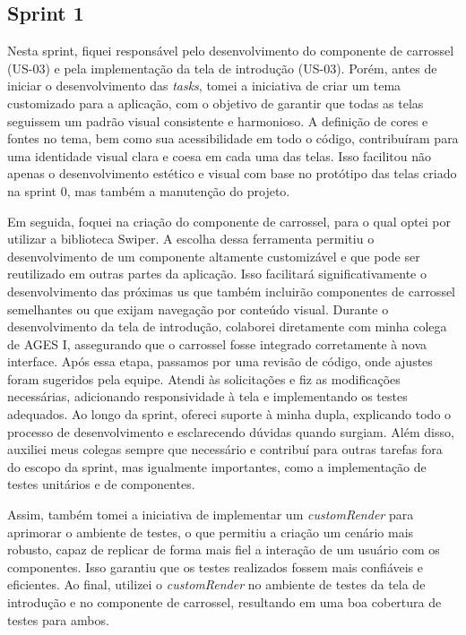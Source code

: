 \subsection{Sprint 1}

Nesta sprint, fiquei responsável pelo desenvolvimento do componente de carrossel (US-03) e pela implementação da tela de introdução (US-03). Porém, antes de iniciar o desenvolvimento das \textit{tasks}, tomei a iniciativa de criar um tema customizado para a aplicação, com o objetivo de garantir que todas as telas seguissem um padrão visual consistente e harmonioso. A definição de cores e fontes no tema, bem como sua acessibilidade em todo o código, contribuíram para uma identidade visual clara e coesa em cada uma das telas. Isso facilitou não apenas o desenvolvimento estético e visual com base no protótipo das telas criado na sprint 0, mas também a manutenção do projeto.

Em seguida, foquei na criação do componente de carrossel, para o qual optei por utilizar a biblioteca Swiper. A escolha dessa ferramenta permitiu o desenvolvimento de um componente altamente customizável e que pode ser reutilizado em outras partes da aplicação. Isso facilitará significativamente o desenvolvimento das próximas \ac{us} que também incluirão componentes de carrossel semelhantes ou que exijam navegação por conteúdo visual. Durante o desenvolvimento da tela de introdução, colaborei diretamente com minha colega de AGES I, assegurando que o carrossel fosse integrado corretamente à nova interface. Após essa etapa, passamos por uma revisão de código, onde ajustes foram sugeridos pela equipe. Atendi às solicitações e fiz as modificações necessárias, adicionando responsividade à tela e implementando os testes adequados. Ao longo da sprint, ofereci suporte à minha dupla, explicando todo o processo de desenvolvimento e esclarecendo dúvidas quando surgiam. Além disso, auxiliei meus colegas sempre que necessário e contribuí para outras tarefas fora do escopo da sprint, mas igualmente importantes, como a implementação de testes unitários e de componentes.

 Assim, também tomei a iniciativa de implementar um \textit{customRender} para aprimorar o ambiente de testes, o que permitiu a criação um cenário mais robusto, capaz de replicar de forma mais fiel a interação de um usuário com os componentes. Isso garantiu que os testes realizados fossem mais confiáveis e eficientes. Ao final, utilizei o \textit{customRender} no ambiente de testes da tela de introdução e no componente de carrossel, resultando em uma boa cobertura de testes para ambos.


